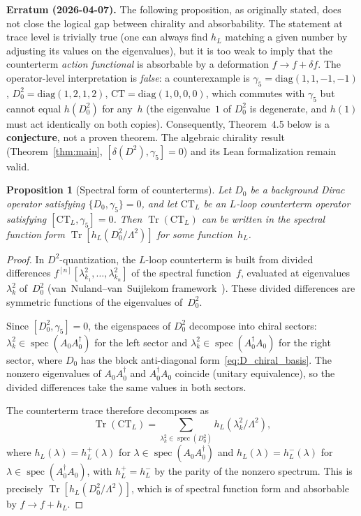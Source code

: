 \documentclass[12pt,a4paper]{article}
\newtheorem{proposition}[theorem]{Proposition}
\theoremstyle{definition}
\theoremstyle{remark}
\newcommand{\Tr}{\operatorname{Tr}}
\newcommand{\Lam}{\Lambda}
\begin{document}
\textbf{Erratum (2026-04-07).}
The following proposition, as originally stated, does not close the logical
gap between chirality and absorbability.  The statement at trace level is
trivially true (one can always find $h_L$ matching a given number by
adjusting its values on the eigenvalues), but it is too weak to imply that
the counterterm \emph{action functional} is absorbable by a deformation
$f \to f + \delta f$. The operator-level interpretation is \emph{false}:
a counterexample is $\gamma_5 = \mathrm{diag}(1,1,-1,-1)$,
$D_0^2 = \mathrm{diag}(1,2,1,2)$, $\mathrm{CT} = \mathrm{diag}(1,0,0,0)$,
which commutes with $\gamma_5$ but cannot equal $h(D_0^2)$ for any~$h$
(the eigenvalue~$1$ of $D_0^2$ is degenerate, and $h(1)$ must act identically
on both copies). Consequently, Theorem~4.5 below is a \textbf{conjecture},
not a proven theorem. The algebraic chirality result
(Theorem~\ref{thm:main}, $[\delta(D^2), \gamma_5] = 0$) and its Lean
formalization remain valid.

\begin{proposition}[Spectral form of counterterms]\label{prop:spectral_form}
Let $D_0$ be a background Dirac operator satisfying $\{D_0, \gamma_5\} = 0$,
and let $\mathrm{CT}_L$ be an $L$-loop counterterm operator satisfying
$[\mathrm{CT}_L, \gamma_5] = 0$.  Then $\Tr(\mathrm{CT}_L)$ can be written in
the spectral function form $\Tr[h_L(D_0^2/\Lam^2)]$ for some function~$h_L$.
\end{proposition}

\begin{proof}
In $D^2$-quantization, the $L$-loop counterterm is built from divided
differences $f^{[n]}[\lambda_{k_1}^2, \ldots, \lambda_{k_n}^2]$ of the
spectral function~$f$, evaluated at eigenvalues $\lambda_k^2$ of~$D_0^2$
(van~Nuland--van~Suijlekom framework~\cite{vanNuland:2021oneloop}).  These
divided differences are symmetric functions of the eigenvalues of~$D_0^2$.

Since $[D_0^2, \gamma_5] = 0$, the eigenspaces of $D_0^2$ decompose into
chiral sectors: $\lambda_k^2 \in \operatorname{spec}(A_0 A_0^\dagger)$ for the
left sector and $\lambda_k^2 \in \operatorname{spec}(A_0^\dagger A_0)$ for the
right sector, where $D_0$ has the block anti-diagonal
form~\eqref{eq:D_chiral_basis}.  The nonzero eigenvalues of $A_0 A_0^\dagger$
and $A_0^\dagger A_0$ coincide (unitary equivalence), so the divided
differences take the same values in both sectors.

The counterterm trace therefore decomposes as
\begin{equation}
  \Tr(\mathrm{CT}_L) = \sum_{\lambda_k^2 \in \operatorname{spec}(D_0^2)}
  h_L(\lambda_k^2/\Lam^2),
\end{equation}
where $h_L(\lambda) = h_L^+(\lambda)$ for $\lambda \in
\operatorname{spec}(A_0 A_0^\dagger)$ and $h_L(\lambda) = h_L^-(\lambda)$ for
$\lambda \in \operatorname{spec}(A_0^\dagger A_0)$, with $h_L^+ = h_L^-$ by
the parity of the nonzero spectrum.  This is precisely
$\Tr[h_L(D_0^2/\Lam^2)]$, which is of spectral function form and absorbable
by $f \to f + h_L$.
\end{proof}
\end{document}
